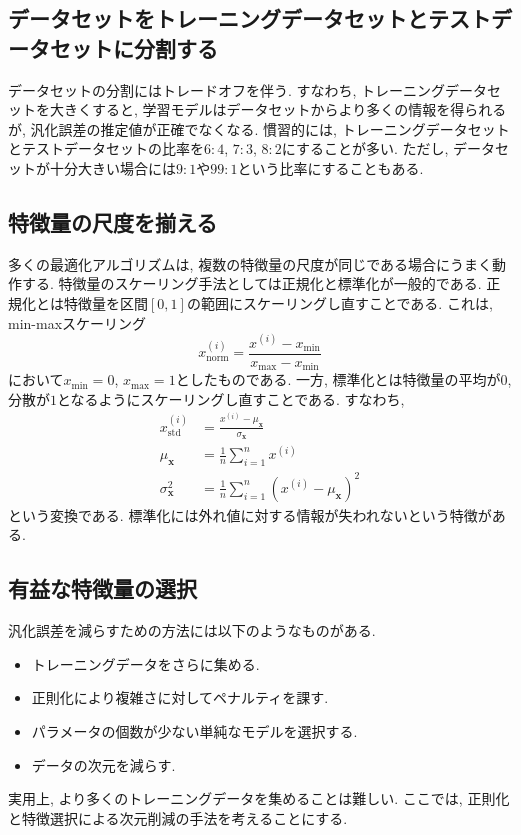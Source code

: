 \documentclass[uplatex]{jsarticle}
\theoremstyle{definition}
\numberwithin{equation}{section}
\begin{document}
\subsection{データセットをトレーニングデータセットとテストデータセットに分割する}
データセットの分割にはトレードオフを伴う.
すなわち, トレーニングデータセットを大きくすると, 学習モデルはデータセットからより多くの情報を得られるが, 汎化誤差の推定値が正確でなくなる.
慣習的には, トレーニングデータセットとテストデータセットの比率を$6:4$, $7:3$, $8:2$にすることが多い.
ただし, データセットが十分大きい場合には$9:1$や$99:1$という比率にすることもある.

\subsection{特徴量の尺度を揃える}
多くの最適化アルゴリズムは, 複数の特徴量の尺度が同じである場合にうまく動作する.
特徴量のスケーリング手法としては正規化と標準化が一般的である.
正規化とは特徴量を区間$[0, 1]$の範囲にスケーリングし直すことである.
これは, min-maxスケーリング
\begin{equation}
    x_{\text{norm}}^{(i)} = \frac{x^{(i)} - x_{\text{min}}}{x_{\text{max}} - x_{\text{min}}}
\end{equation}
において$x_{\text{min}} = 0$, $x_{\text{max}} = 1$としたものである.
一方, 標準化とは特徴量の平均が$0$, 分散が$1$となるようにスケーリングし直すことである.
すなわち, 
\begin{align}
    x_{\text{std}}^{(i)} &= \frac{x^{(i)} - \mu_{\bm{x}}}{\sigma_{\bm{x}}} \\
    \mu_{\bm{x}} &= \frac{1}{n}\sum_{i = 1}^{n} x^{(i)} \\
    \sigma_{\bm{x}}^{2} &= \frac{1}{n}\sum_{i = 1}^{n} (x^{(i)} - \mu_{\bm{x}})^{2}
\end{align}
という変換である.
標準化には外れ値に対する情報が失われないという特徴がある.

\subsection{有益な特徴量の選択}
汎化誤差を減らすための方法には以下のようなものがある.
\begin{itemize}
    \item
    トレーニングデータをさらに集める.
    \item
    正則化により複雑さに対してペナルティを課す.
    \item
    パラメータの個数が少ない単純なモデルを選択する.
    \item
    データの次元を減らす.
\end{itemize}
実用上, より多くのトレーニングデータを集めることは難しい.
ここでは, 正則化と特徴選択による次元削減の手法を考えることにする.
\end{document}
